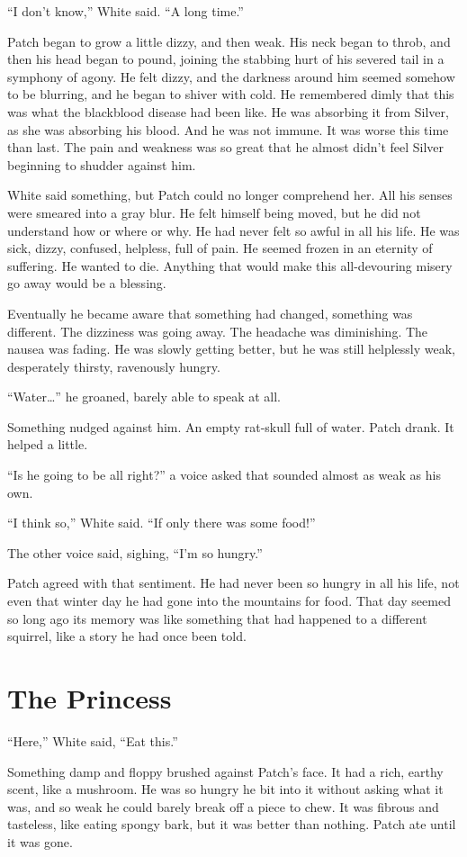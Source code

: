 \documentclass[ebook,oneside,openany,17pt]{memoir}
\renewcommand{\thechapter}{\Roman{chapter}}
\newcounter{sections}
\newcommand{\sections}[1]{%
  \section*{#1}
  \addtocounter{sections}{1}%
  \pdfbookmark[1]{#1}{section.\thechapter.\thesections}}
\begin{document}
“I don’t know,” White said. “A long time.”

Patch began to grow a little dizzy, and then weak. His neck began to
throb, and then his head began to pound, joining the stabbing hurt of
his severed tail in a symphony of agony. He felt dizzy, and the
darkness around him seemed somehow to be blurring, and he began to
shiver with cold. He remembered dimly that this was what the
blackblood disease had been like. He was absorbing it from Silver, as
she was absorbing his blood. And he was not immune. It was worse this
time than last. The pain and weakness was so great that he almost
didn’t feel Silver beginning to shudder against him.

White said something, but Patch could no longer comprehend her. All
his senses were smeared into a gray blur. He felt himself being moved,
but he did not understand how or where or why. He had never felt so
awful in all his life. He was sick, dizzy, confused, helpless, full of
pain. He seemed frozen in an eternity of suffering. He wanted to
die. Anything that would make this all-devouring misery go away would
be a blessing.

Eventually he became aware that something had changed, something was
different. The dizziness was going away. The headache was
diminishing. The nausea was fading. He was slowly getting better, but
he was still helplessly weak, desperately thirsty, ravenously hungry.

“Water…” he groaned, barely able to speak at all.

Something nudged against him. An empty rat-skull full of water. Patch
drank. It helped a little.

“Is he going to be all right?” a voice asked that sounded almost as
weak as his own.

“I think so,” White said. “If only there was some food!”

The other voice said, sighing, “I’m so hungry.”

Patch agreed with that sentiment. He had never been so hungry in all
his life, not even that winter day he had gone into the mountains for
food. That day seemed so long ago its memory was like something that
had happened to a different squirrel, like a story he had once been
told.


\sections{The Princess}

“Here,” White said, “Eat this.”

Something damp and floppy brushed against Patch’s face. It had a rich,
earthy scent, like a mushroom. He was so hungry he bit into it without
asking what it was, and so weak he could barely break off a piece to
chew. It was fibrous and tasteless, like eating spongy bark, but it
was better than nothing. Patch ate until it was gone.
\end{document}
